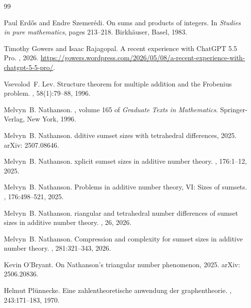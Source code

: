 \begin{thebibliography}{99}

Paul Erd\H{o}s and Endre Szemer\'edi.
\newblock On sums and products of integers.
\newblock In {\em Studies in pure mathematics}, pages 213--218. Birkh\"auser, Basel, 1983.

Timothy Gowers and Isaac Rajagopal.
\newblock A recent experience with {C}hat{GPT} 5.5 {P}ro.
, 2026.
\newblock \url{https://gowers.wordpress.com/2026/05/08/a-recent-experience-with-chatgpt-5-5-pro/}.

Vsevolod~F. Lev.
\newblock Structure theorem for multiple addition and the {F}robenius problem.
, 58(1):79--88, 1996.

Melvyn~B. Nathanson.
, volume 165 of {\em Graduate Texts in Mathematics}.
\newblock Springer-Verlag, New York, 1996.

Melvyn~B. Nathanson.
dditive sumset sizes with tetrahedral differences, 2025.
\newblock arXiv: 2507.08646.

Melvyn~B. Nathanson.
xplicit sumset sizes in additive number theory.
, 176:1--12, 2025.

Melvyn~B. Nathanson.
\newblock Problems in additive number theory, {VI}: Sizes of sumsets.
, 176:498--521, 2025.

Melvyn~B. Nathanson.
riangular and tetrahedral number differences of sumset sizes in additive number theory.
, 26, 2026.

Melvyn~B. Nathanson.
\newblock Compression and complexity for sumset sizes in additive number theory.
, 281:321--343, 2026.

Kevin O'Bryant.
\newblock On {N}athanson's triangular number phenomenon, 2025.
\newblock arXiv: 2506.20836.

Helmut Pl{\"{u}}nnecke.
\newblock Eine zahlentheoretische anwendung der graphentheorie.
, 243:171--183, 1970.


\end{thebibliography}
